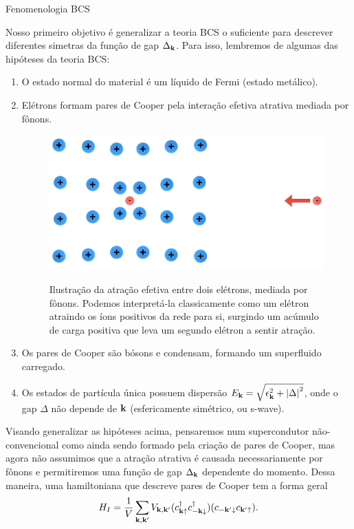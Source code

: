 \documentclass[a4paper,10pt]{article}
\begin{document}
\begin{section}{Fenomenologia BCS} \label{sec:bcs}

Nosso primeiro objetivo é generalizar a teoria BCS o suficiente para descrever diferentes simetras da função de gap $\Delta_{\vb{k}}$. Para isso, lembremos de algumas das hipóteses da teoria BCS:

\begin{enumerate}
\item O estado normal do material é um líquido de Fermi (estado metálico).

\item Elétrons formam pares de Cooper pela interação efetiva atrativa mediada por fônons.

\n

\begin{figure}[H]
\centering
\includegraphics[width=0.6\linewidth]{fig/phonon.png}
\label{fig:phonon}
\caption{Ilustração da atração efetiva entre dois elétrons, mediada por fônons. Podemos interpretá-la classicamente como um elétron atraindo os íons positivos da rede para si, surgindo um acúmulo de carga positiva que leva um segundo elétron a sentir atração.}
\end{figure}

\n

\item Os pares de Cooper são bósons e condensam, formando um superfluido carregado.

\item Os estados de partícula única possuem dispersão $E_{\vb{k}} = \sqrt{\epsilon_{\vb{k}}^2 + \abs{\Delta}^2}$, onde o gap $\Delta$ não depende de $\vb{k}$ (esfericamente simétrico, ou s-wave).
\end{enumerate}



Visando generalizar as hipóteses acima, pensaremos num supercondutor não-convencional como ainda sendo formado pela criação de pares de Cooper, mas agora não assumimos que a atração atrativa é causada necessariamente por fônons e permitiremos uma função de gap $\Delta_{\vb{k}}$ dependente do momento. Dessa maneira, uma hamiltoniana que descreve pares de Cooper tem a forma geral
\begin{equation} \label{eq:hamilbcs}
H_I =
\frac{1}{V} \sum_{\vb{k},\vb{k}'} V_{\vb{k},\vb{k}'} (c_{\vb{k}\uparrow}^\dagger c_{-\vb{k}\downarrow}^\dagger) (c_{-\vb{k}'\downarrow} c_{\vb{k}'\uparrow}).
\end{equation}


\end{section}
\end{document}
